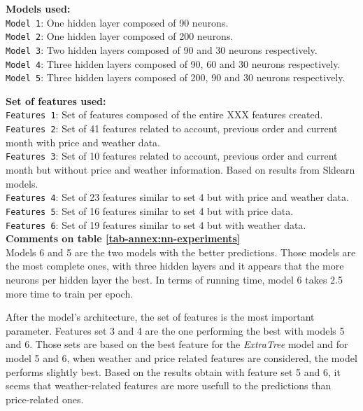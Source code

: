 \noindent\textbf{Models used:}\\
\texttt{Model 1}: One hidden layer composed of 90 neurons. \\
\texttt{Model 2}: One hidden layer composed of 200 neurons. \\
\texttt{Model 3}: Two hidden layers composed of 90 and 30 neurons respectively. \\
\texttt{Model 4}: Three hidden layers composed of 90, 60 and 30 neurons respectively. \\
\texttt{Model 5}: Three hidden layers composed of 200, 90 and 30 neurons respectively. \\

\pagebreak

\noindent\textbf{Set of features used:}\\
\texttt{Features 1}: Set of features composed of the entire XXX features created. \\
\texttt{Features 2}: Set of 41 features related to account, previous order and current month with price and weather data. \\
\texttt{Features 3}: Set of 10 features related to account, previous order and current month but without price and weather information. Based on results from Sklearn models.\\
\texttt{Features 4}: Set of 23 features similar to set 4 but with price and weather data. \\
\texttt{Features 5}: Set of 16 features similar to set 4 but with price data. \\
\texttt{Features 6}: Set of 19 features similar to set 4 but with weather data. \\


\noindent\textbf{Comments on table \ref{tab-annex:nn-experiments}}\\
\indent Models 6 and 5 are the two models with the better predictions. Those models are the most complete ones, with three hidden layers and it appears that the more neurons per hidden layer the best. In terms of running time, model 6 takes 2.5 more time to train per epoch.

After the model's architecture, the set of features is the most important parameter. Features set 3 and 4 are the one performing the best with models 5 and 6. Those sets are based on the best feature for the \textit{ExtraTree} model and for model 5 and 6, when weather and price related features are considered, the model performs slightly best. Based on the results obtain with feature set 5 and 6, it seems that weather-related features are more usefull to the predictions than price-related ones.


